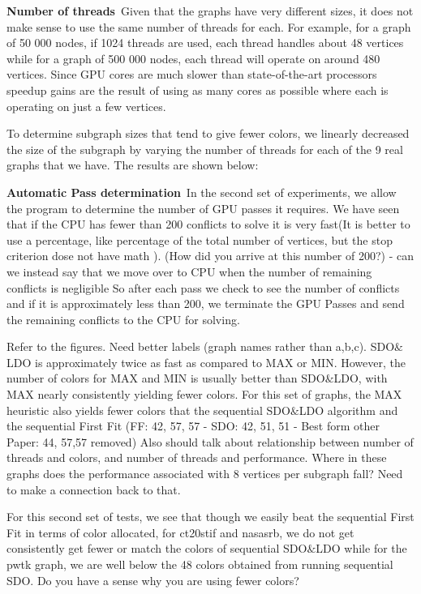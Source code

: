 \documentclass[preprint]{sigplanconf}
\begin{document}
\textbf{Number of threads}\
Given that the graphs have very different sizes, it does not make sense to use the same number of threads for each. For example, for a graph of 50 000 nodes, if 1024 threads are used, each thread handles about 48 vertices while for a graph of 500 000 nodes, each thread will operate on around 480 vertices. Since GPU cores are much slower than state-of-the-art processors speedup gains are the result of using as many cores as possible where each is operating on just a few vertices.

To determine subgraph sizes that tend to give fewer colors, we linearly decreased the size of the subgraph by varying the number of threads for each of the 9 real graphs that we have. The results are shown below:


\textbf{Automatic Pass determination}\
In the second set of experiments, we allow the program to determine the number of GPU passes it requires. We have seen that if the CPU has fewer than 200 conflicts to solve it is very fast(It is better to use a percentage, like percentage of the total number of vertices, but the stop criterion dose not have math ). (How did you arrive at this number of 200?)  - can we instead say that we move over to CPU when the number of remaining conflicts is negligible So after each pass we check to see the number of conflicts and if it is approximately less than 200, we terminate the GPU Passes and send the remaining conflicts to the CPU for solving.\


Refer to the figures.  Need better labels (graph names rather than a,b,c).  SDO$\&$LDO is approximately twice as fast as compared to MAX or MIN. However, the number of colors for MAX and MIN is usually better than SDO$\&$LDO, with MAX nearly consistently yielding  fewer colors. For this set of graphs, the MAX heuristic also yields fewer colors that the sequential SDO$\&$LDO algorithm and the sequential First Fit   (FF: 42, 57, 57 - SDO: 42, 51, 51 - Best form other Paper: 44, 57,57 removed)  Also should talk about relationship between number of threads and colors, and number of threads and performance.  Where in these graphs does the performance associated with 8 vertices per subgraph fall?  Need to make a connection back to that.\

For this second set of tests, we see that though we easily beat the sequential First Fit in terms of color allocated, for ct20stif and nasasrb, we do not get consistently get fewer or match the colors of sequential SDO$\&$LDO while for the pwtk graph, we are well below the 48 colors obtained from running sequential SDO.  Do you have a sense why you are using fewer colors?
\end{document}
